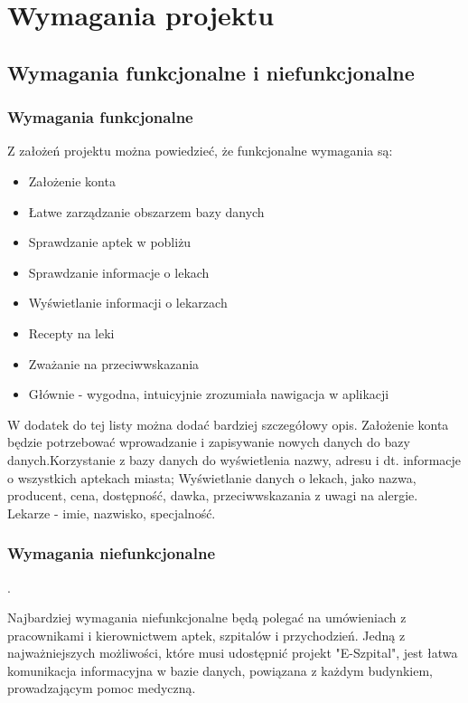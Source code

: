 \chapter{Wymagania projektu}
\section{Wymagania funkcjonalne i niefunkcjonalne}
\subsection{Wymagania funkcjonalne}

Z założeń projektu można powiedzieć, że funkcjonalne wymagania są:
\begin{itemize}
   \item Założenie konta
   \item Łatwe zarządzanie obszarzem bazy danych 
\item Sprawdzanie aptek w pobliżu
\item Sprawdzanie informacje o lekach
\item Wyświetlanie informacji o lekarzach
\item Recepty na leki 
\item Zważanie na przeciwwskazania
\item Głównie - wygodna, intuicyjnie zrozumiała nawigacja w aplikacji
\end{itemize}

W dodatek do tej listy można dodać bardziej szczegółowy opis. Założenie konta będzie potrzebować wprowadzanie i zapisywanie nowych danych do bazy danych.\newline Korzystanie z bazy danych do wyświetlenia nazwy, adresu i dt. informacje o wszystkich aptekach miasta; \newline Wyświetlanie danych o lekach, jako nazwa, producent, cena, dostępność, dawka, przeciwwskazania z uwagi na alergie. \newline Lekarze - imie, nazwisko, specjalność.
\subsection{Wymagania niefunkcjonalne}\label{przypisy}. 

Najbardziej wymagania niefunkcjonalne będą polegać na umówieniach z pracownikami i kierownictwem aptek, szpitalów i przychodzień. Jedną z najważniejszych możliwości, które musi udostępnić projekt "E-Szpital", jest łatwa komunikacja informacyjna w bazie danych, powiązana z każdym budynkiem, prowadzającym pomoc medyczną. \newline



